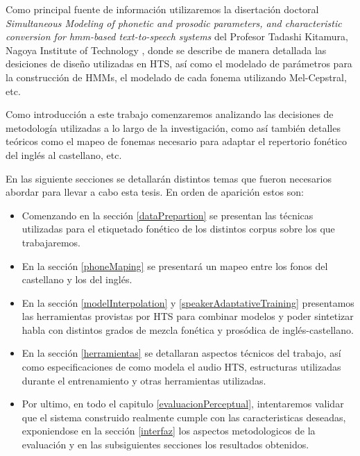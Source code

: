 \noindent Como principal fuente de información utilizaremos la disertación doctoral \textit{Simultaneous Modeling of phonetic and prosodic parameters, and characteristic conversion for hmm-based text-to-speech systems} del Profesor Tadashi Kitamura, Nagoya Institute of Technology \cite{phoneticAndProsodic}, donde se describe de manera detallada las desiciones de diseño utilizadas en HTS, así como el modelado de parámetros para la construcción de HMMs, el modelado de cada fonema utilizando Mel-Cepstral, etc.

\noindent Como introducción a este trabajo comenzaremos analizando las decisiones de metodología utilizadas a lo largo de la investigación, como así también detalles teóricos como el mapeo de fonemas necesario para adaptar el repertorio fonético del inglés al castellano, etc.

\noindent En las siguiente secciones se detallarán distintos temas que fueron necesarios abordar para llevar a cabo esta tesis. En orden de aparición estos son:

\begin{itemize}
\item Comenzando en la sección \ref{dataPrepartion} se presentan las técnicas utilizadas para el etiquetado fonético de los distintos corpus sobre los que trabajaremos.

\item En la sección \ref{phoneMaping} se presentará un mapeo entre los fonos del castellano y los del inglés.

\item En la sección \ref{modelInterpolation} y \ref{speakerAdaptativeTraining} presentamos las herramientas provistas por HTS para combinar modelos y poder sintetizar habla con distintos grados de mezcla fonética y prosódica de inglés-castellano.

\item En la sección \ref{herramientas} se detallaran aspectos técnicos del trabajo, así como especificaciones de como modela el audio HTS, estructuras utilizadas durante el entrenamiento y otras herramientas utilizadas. 

\item Por ultimo, en todo el capitulo \ref{evaluacionPerceptual}, intentaremos validar que el sistema construido realmente cumple con las caracteristicas deseadas, exponiendose en la sección \ref{interfaz} los aspectos metodologicos de la evaluación y en las subsiguientes secciones los resultados obtenidos.

\end{itemize}

